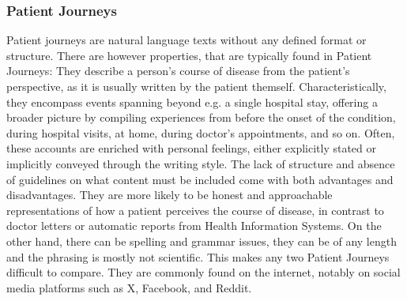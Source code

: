 \subsubsection*{Patient Journeys}\label{sec:pj}
Patient journeys are natural language texts without any defined format or structure. There are however properties, that are typically found in Patient Journeys: They describe a person's course of disease from the patient's perspective, as it is usually written by the patient themself. Characteristically, they encompass events spanning beyond e.g. a single hospital stay, offering a broader picture by compiling experiences from before the onset of the condition, during hospital visits, at home, during doctor's appointments, and so on. Often, these accounts are enriched with personal feelings, either explicitly stated or implicitly conveyed through the writing style. The lack of structure and absence of guidelines on what content must be included come with both advantages and disadvantages. They are more likely to be honest and approachable representations of how a patient perceives the course of disease, in contrast to doctor letters or automatic reports from Health Information Systems. On the other hand, there can be spelling and grammar issues, they can be of any length and the phrasing is mostly not scientific. This makes any two Patient Journeys difficult to compare. They are commonly found on the internet, notably on social media platforms such as X, Facebook, and Reddit.


